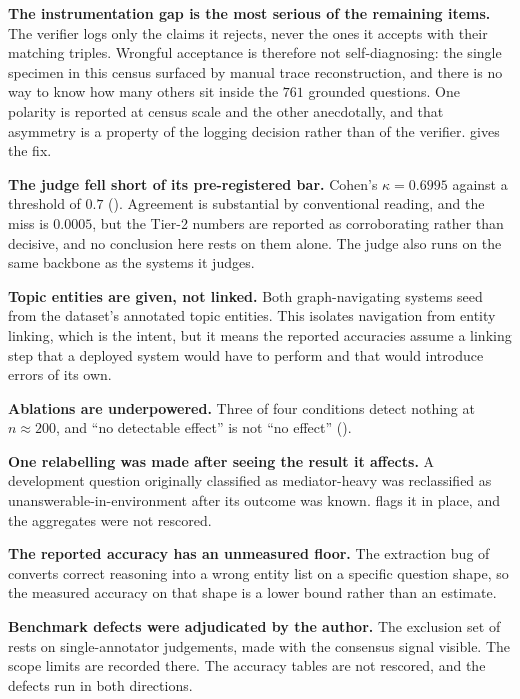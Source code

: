 \textbf{The instrumentation gap is the most serious of the remaining items.} The
verifier logs only the claims it rejects, never the ones it accepts with their
matching triples. Wrongful acceptance is therefore not self-diagnosing: the
single specimen in this census surfaced by manual trace reconstruction, and
there is no way to know how many others sit inside the $761$ grounded questions.
One polarity is reported at census scale and the other anecdotally, and that
asymmetry is a property of the logging decision rather than of the verifier.
 gives the fix.

\textbf{The judge fell short of its pre-registered bar.} Cohen's $\kappa =
0.6995$ against a threshold of $0.7$ (). Agreement is
substantial by conventional reading, and the miss is $0.0005$, but the Tier-2
numbers are reported as corroborating rather than decisive, and no conclusion
here rests on them alone. The judge also runs on the same backbone as the
systems it judges.

\textbf{Topic entities are given, not linked.} Both graph-navigating systems
seed from the dataset's annotated topic entities. This isolates navigation from
entity linking, which is the intent, but it means the reported accuracies assume
a linking step that a deployed system would have to perform and that would
introduce errors of its own.

\textbf{Ablations are underpowered.} Three of four conditions detect nothing at
$n \approx 200$, and ``no detectable effect'' is not ``no effect''
().

\textbf{One relabelling was made after seeing the result it affects.} A
development question originally classified as mediator-heavy was reclassified as
unanswerable-in-environment after its outcome was known.
 flags it in place, and the aggregates were not
rescored.

\textbf{The reported accuracy has an unmeasured floor.} The extraction bug of
 converts correct reasoning into a wrong entity
list on a specific question shape, so the measured accuracy on that shape is a
lower bound rather than an estimate.

\textbf{Benchmark defects were adjudicated by the author.} The exclusion set of
 rests on single-annotator judgements, made with the
consensus signal visible. The scope limits are recorded there. The accuracy
tables are not rescored, and the defects run in both directions.

\endinput
